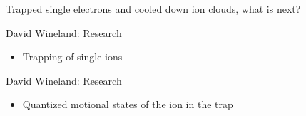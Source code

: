 \begin{frame}[c]
  \begin{center}
      \Large Trapped single electrons and cooled down ion clouds, what is next?  
  \end{center}
\end{frame}

\begin{frame}[t]{David Wineland: Research}

  \begin{minipage}[t][4.5cm][t]{\textwidth-1.5cm}
    \begin{itemize}
      \item Trapping of single ions
    \end{itemize}  
  \end{minipage}
  \begin{minipage}[t][0.2\textheight][t]{\textwidth}
  \end{minipage}
\end{frame}

\begin{frame}[t]{David Wineland: Research}

  \begin{minipage}[t][4.5cm][t]{\textwidth-1.5cm}
    \begin{itemize}
      \item Quantized motional states of the ion in the trap
    \end{itemize}  
  \end{minipage}
  \begin{minipage}[t][0.2\textheight][t]{\textwidth}
  \end{minipage}
\end{frame}

